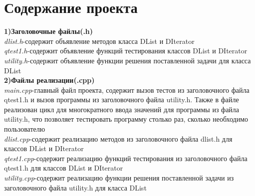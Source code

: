 \documentclass[a4paper]{article}
\begin{document}
          
\newpage
{\section{Содержание проекта}
        \hfill\break
        \hfill\break
{\bf 1)Заголовочные файлы(.h)}\\
        \hfill\break
        \textit{dlist.h}-содержит объявление методов класса DList и DIterator\\        
        \hfill\break
        \textit{qtest1.h}-содержит объявление функций тестирования классов DList и DIterator\\
        \hfill\break
        \textit{utility.h}-содержит объявление функции решения поставленной задачи для класса DList\\
        \hfill\break
        \hfill\break
{\bf 2)Файлы реализации(.cpp)}\\
        \hfill\break
        \textit{main.cpp}-главный файл проекта, содержит вызов тестов из заголовочного файла qtest1.h и вызов программы из заголовочного файла  utility.h. Также в файле реализован цикл для многократного ввода значений для программы из файла utility.h, что позволяет тестировать программу столько раз, сколько необходимо пользователю\\
        \hfill\break     
        \textit{dlist.cpp}-содержит реализацию методов из заголовочного файла dlist.h для классов DList и DIterator\\        
        \hfill\break
        \textit{qtest1.cpp}-содержит реализацию функций тестирования из заголовочного файла qtest1.h для классов DList и DIterator\\
        \hfill\break
        \textit{utility.cpp}-содержит реализацию функции решения поставленной задачи из заголовочного файла utility.h для класса DList\\
}
	
	\newpage %
	
	\newpage %
	
\end{document}
